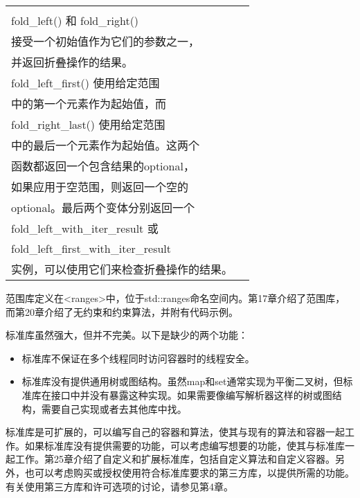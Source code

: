 \begin{longtable}{|l|l|}
\begin{tabular}[c]{@{}l@{}}对给定范围的元素进行左折叠或右折叠。\\fold\_left() 和 fold\_right() \\接受一个初始值作为它们的参数之一，\\并返回折叠操作的结果。\\fold\_left\_first() 使用给定范围\\中的第一个元素作为起始值，而 \\fold\_right\_last() 使用给定范围\\中的最后一个元素作为起始值。这两个\\函数都返回一个包含结果的optional，\\如果应用于空范围，则返回一个空的\\optional。最后两个变体分别返回一个\\fold\_left\_with\_iter\_result 或 \\fold\_left\_first\_with\_iter\_result \\实例，可以使用它们来检查折叠操作的结果。
\end{tabular} \\ \hline
\end{longtable}


范围库定义在<ranges>中，位于std::ranges命名空间内。第17章介绍了范围库，而第20章介绍了无约束和约束算法，并附有代码示例。


标准库虽然强大，但并不完美。以下是缺少的两个功能：

\begin{itemize}
\item
标准库不保证在多个线程同时访问容器时的线程安全。

\item
标准库没有提供通用树或图结构。虽然map和set通常实现为平衡二叉树，但标准库在接口中并没有暴露这种实现。如果需要像编写解析器这样的树或图结构，需要自己实现或者去其他库中找。
\end{itemize}

标准库是可扩展的，可以编写自己的容器和算法，使其与现有的算法和容器一起工作。如果标准库没有提供需要的功能，可以考虑编写想要的功能，使其与标准库一起工作。第25章介绍了自定义和扩展标准库，包括自定义算法和自定义容器。另外，也可以考虑购买或授权使用符合标准库要求的第三方库，以提供所需的功能。有关使用第三方库和许可选项的讨论，请参见第4章。






